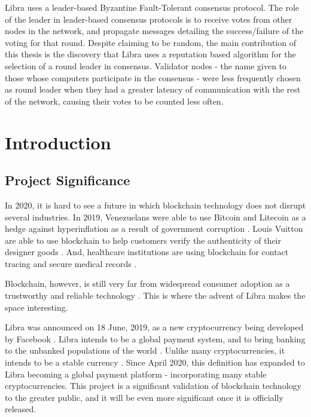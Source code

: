 \documentclass[12pt,openany,a4paper]{book}
\begin{document}
Libra uses a leader-based Byzantine Fault-Tolerant consensus protocol. The role of the 
leader in leader-based consensus protocols is to receive votes from other nodes in 
the network, and propagate messages detailing the success/failure of the voting for that round.
Despite claiming to be random, the main contribution of this thesis is the discovery 
that Libra uses a reputation based algorithm for the selection of a round leader in 
consensus. Validator nodes - the name given to those whose computers
participate in the consensus - were less frequently chosen as round leader 
when they had a greater latency of communication with the rest of the network,
causing their votes to be counted less often.

\tableofcontents

\listoffigures
{}

\listoftables
{}

\cleardoublepage










\mainmatter

\chapter{Introduction}
\section{Project Significance}
In 2020, it is hard to see a future in which blockchain technology does not disrupt several industries.
In 2019, Venezuelans were able to use Bitcoin and Litecoin as a hedge against hyperinflation 
as a result of government corruption \cite{venezuela_btc, venezuela_btc2}. 
Louis Vuitton are able to use blockchain to help customers verify the authenticity of their designer goods \cite{blockchain_LV}.
And, healthcare institutions are using blockchain for contact tracing and secure 
medical records \cite{blockchain_healthcare, blockchain_healthcare2}.

Blockchain, however, is still very far from widespread consumer adoption as a 
trustworthy and reliable technology \cite{prewett_2020}. This is where the advent of Libra makes the space interesting.

Libra was announced on 18 June, 2019, as a new cryptocurrency being developed by Facebook \cite{isaac_popper_2019}.
Libra intends to be a global payment system, and to bring banking to the unbanked 
populations of the world \cite{libra_vision}. 
Unlike many cryptocurrencies, it intends to be a stable currency \cite{libra_whitepaper}.
Since April 2020, this definition has expanded to Libra becoming a global payment platform - incorporating many 
stable cryptocurrencies.
This project is a significant validation of blockchain technology to the greater public, and it
will be even more significant once it is officially released.
\end{document}
